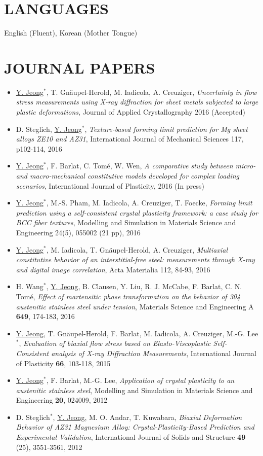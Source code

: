 \documentclass{res}
\begin{document}
\begin{resume}
  \section{LANGUAGES}
  English (Fluent), Korean (Mother Tongue)

  \section{JOURNAL PAPERS}
  \begin{itemize}
  \item \underline{Y. Jeong}$^*$, T. Gn\"{a}upel-Herold, M. Iadicola, A. Creuziger, {\it Uncertainty in flow stress measurements using X-ray diffraction for sheet metals subjected to large plastic deformations}, Journal of Applied Crystallography 2016 (Accepted)
  \item D. Steglich, \underline{Y. Jeong}$^*$, {\it Texture-based forming limit prediction for Mg sheet alloys ZE10 and AZ31}, International Journal of Mechanical Sciences 117, p102-114, 2016
  \item \underline{Y. Jeong}$^*$, F. Barlat, C. Tom\'{e}, W. Wen, {\it A comparative study between micro- and macro-mechanical constitutive models developed for complex loading scenarios}, International Journal of Plasticity, 2016 (In press)
  \item \underline{Y. Jeong}$^*$, M.-S. Pham, M. Iadicola, A. Creuziger, T. Foecke, {\it Forming limit prediction using a self-consistent crystal plasticity framework: a case study for BCC fiber textures}, Modelling and Simulation in Materials Science and Engineering 24(5), 055002 (21 pp), 2016
  \item \underline{Y. Jeong}$^*$, M. Iadicola, T. Gn\"{a}upel-Herold, A. Creuziger, {\it Multiaxial constitutive behavior of an interstitial-free steel: measurements through X-ray and digital image correlation}, Acta Materialia 112, 84-93, 2016
  \item H. Wang$^*$, \underline{Y. Jeong}, B. Clausen, Y. Liu, R. J. McCabe, F. Barlat, C. N. Tom\'{e}, {\it Effect of martensitic phase transformation on the behavior of 304 austenitic stainless steel under tension}, Materials Science and Engineering A {\bf 649}, 174-183, 2016
  \item \underline{Y. Jeong}, T. Gn\"{a}upel-Herold, F. Barlat, M. Iadicola, A. Creuziger, M.-G. Lee$^*$, {\it Evaluation of biaxial flow stress based on Elasto-Viscoplastic Self-Consistent analysis of X-ray Diffraction Measurements}, International Journal of Plasticity {\bf 66}, 103-118, 2015
  \item \underline{Y. Jeong}$^*$, F. Barlat, M.-G. Lee,  {\it Application of crystal plasticity to an austenitic stainless steel}, Modelling and Simulation in Materials Science and Engineering {\bf 20}, 024009, 2012
  \item D. Steglich$^*$, \underline{Y. Jeong}, M. O. Andar, T. Kuwabara, {\it Biaxial Deformation Behavior of AZ31 Magnesium Alloy: Crystal-Plasticity-Based Prediction and Experimental Validation}, International Journal of Solids and Structure {\bf 49} (25), 3551-3561, 2012
  \end{itemize}


\end{resume}
\end{document}
